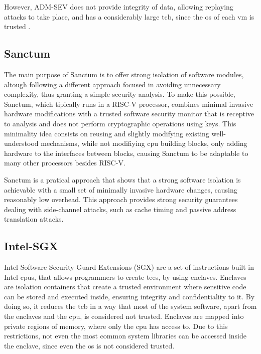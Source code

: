 However, ADM-SEV does not provide integrity of data, allowing replaying attacks to take place, and has a considerably large \gls{tcb}, since the \gls{os} of each \gls{vm} is trusted \cite{amdSEVPaper}. 

\subsection{Sanctum}
\label{ssec:sanctum}
The main purpose of Sanctum \cite{sanctumPaper} is to offer strong isolation of software modules, altough following a different approach focused in avoiding unnecessary complexity, thus granting a simple security analysis.
To make this possible, Sanctum, which tipically runs in a RISC-V processor, combines minimal invasive hardware modifications with a trusted software security monitor that is receptive to analysis and does not perform cryptographic operations using keys. 
This minimality idea consists on reusing and slightly modifying existing well-understood mechanisms, while not modifiying \gls{cpu} building blocks, only adding hardware to the interfaces between blocks, causing Sanctum to be adaptable to many other processors besides RISC-V. 

Sanctum is a pratical approach that shows that a strong software isolation is achievable with a small set of minimally invasive hardware changes, causing reasonably low overhead. 
This approach provides strong security guarantees dealing with side-channel attacks, such as cache timing and passive address translation attacks.

\subsection{Intel-SGX}
\label{ssec:intelsgx}
Intel Software Security Guard Extensions (SGX) \cite{intelSGX} are a set of instructions built in Intel \gls{cpu}s, that allows programmers to create \gls{tee}s, by using enclaves. Enclaves are isolation containers that create a trusted environment where sensitive code can be stored and executed inside, ensuring integrity and confidentiality to it. By doing so, it reduces the \gls{tcb} in a way that most of the system software, apart from the enclaves and the \gls{cpu}, is considered not trusted.
Enclaves are mapped into private regions of memory, where only the \gls{cpu} has access to. Due to this restrictions, not even the most common system libraries can be accessed inside the enclave, since even the \gls{os} is not considered trusted. 

